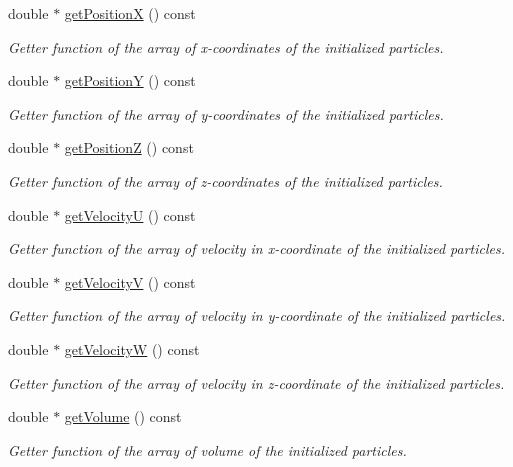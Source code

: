 \begin{DoxyCompactItemize}
double $\ast$ \hyperlink{classInitializer_a2b19b845e3fa7b7009fd97dab4e3e6a9}{get\-Position\-X} () const 
\begin{DoxyCompactList}\small\item\em Getter function of the array of x-\/coordinates of the initialized particles. \end{DoxyCompactList}\item 
double $\ast$ \hyperlink{classInitializer_a96d8812e9f8972d2f2461a691bb66ad5}{get\-Position\-Y} () const 
\begin{DoxyCompactList}\small\item\em Getter function of the array of y-\/coordinates of the initialized particles. \end{DoxyCompactList}\item 
double $\ast$ \hyperlink{classInitializer_a144439df028b3768b0c0ad7a8e4926c4}{get\-Position\-Z} () const 
\begin{DoxyCompactList}\small\item\em Getter function of the array of z-\/coordinates of the initialized particles. \end{DoxyCompactList}\item 
double $\ast$ \hyperlink{classInitializer_a519f3ec935a5c159c564d7877ee5b9a9}{get\-Velocity\-U} () const 
\begin{DoxyCompactList}\small\item\em Getter function of the array of velocity in x-\/coordinate of the initialized particles. \end{DoxyCompactList}\item 
double $\ast$ \hyperlink{classInitializer_aaba9434291386479dbeda9c1b436556b}{get\-Velocity\-V} () const 
\begin{DoxyCompactList}\small\item\em Getter function of the array of velocity in y-\/coordinate of the initialized particles. \end{DoxyCompactList}\item 
double $\ast$ \hyperlink{classInitializer_ad522318d3fe5d4d3019941cd75b4a078}{get\-Velocity\-W} () const 
\begin{DoxyCompactList}\small\item\em Getter function of the array of velocity in z-\/coordinate of the initialized particles. \end{DoxyCompactList}\item 
double $\ast$ \hyperlink{classInitializer_ade9b3fe198ecb8b7b4d0f90a34e69b41}{get\-Volume} () const 
\begin{DoxyCompactList}\small\item\em Getter function of the array of volume of the initialized particles. \end{DoxyCompactList}\item 

\end{DoxyCompactItemize}
